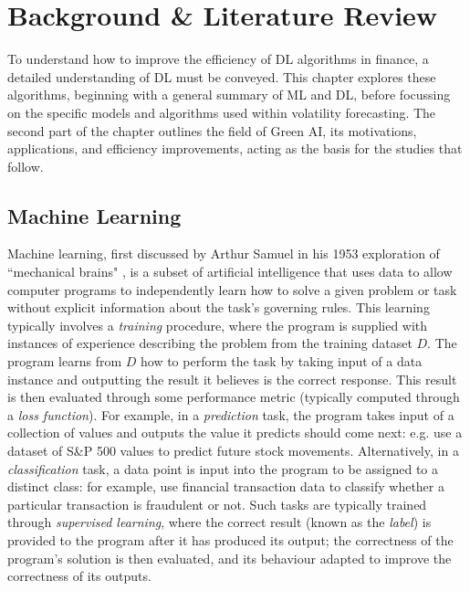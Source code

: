 \documentclass[a4paper, 11pt]{report}
\begin{document}
    \newpage
    \chapter{Background \& Literature Review}
    \label{chapter: literature}

    To understand how to improve the efficiency of DL algorithms in finance, a detailed understanding of DL must be conveyed. This chapter explores these algorithms, beginning with a general summary of ML and DL, before focussing on the specific models and algorithms used within volatility forecasting. The second part of the chapter outlines the field of Green AI, its motivations, applications, and efficiency improvements, acting as the basis for the studies that follow.


    \section{Machine Learning}

    Machine learning, first discussed by Arthur Samuel in his 1953 exploration of ``mechanical brains" \citep{samuel-1959}, is a subset of artificial intelligence that uses data to allow computer programs to independently learn how to solve a given problem or task without explicit information about the task's governing rules. This learning typically involves a \emph{training} procedure, where the program is supplied with instances of experience describing the problem from the training dataset $D$. The program learns from $D$ how to perform the  task by taking input of a data instance and outputting the result it believes is the correct response. This result is then evaluated through some performance metric (typically computed through a \emph{loss function}). For example, in a \emph{prediction} task, the program takes input of a collection of values and outputs the value it predicts should come next: e.g. \citet{xiong-2015} use a dataset of S\&P 500 values to predict future stock movements. Alternatively, in a \emph{classification} task, a data point is input into the program to be assigned to a distinct class: for example, \citet{sadgali-2019} use financial transaction data to classify whether a particular transaction is fraudulent or not. Such tasks are typically trained through \emph{supervised learning}, where the correct result (known as the \emph{label}) is provided to the program after it has produced its output; the correctness of the program's solution is then evaluated, and its behaviour adapted to improve the correctness of its outputs.
\end{document}
